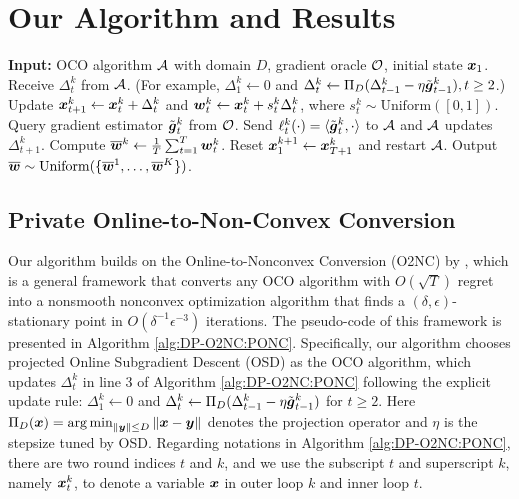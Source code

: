 \section{Our Algorithm and Results}
\label{sec:DP-O2NC_result}

\begin{algorithm}[t]
\caption{Online-to-Nonconvex Conversion}
\label{alg:DP-O2NC:PONC}
\begin{algorithmic}[1]
    \Statex \textbf{Input:} OCO algorithm ${\cal A}$ with domain $D$, gradient oracle ${\cal O}$, initial state ${\boldsymbol{x}}_1$.
        \State Receive $\Delta_t^k$ from ${\cal A}$. (For example, $\Delta_1^k\gets 0$ and $\Delta_t^k\gets\Pi_D(\Delta_{t-1}^k-\eta\tilde{{\boldsymbol{g}}}_{t-1}^k), t\ge 2$.)
        \State Update ${\boldsymbol{x}}_{t+1}^k \gets {\boldsymbol{x}}_t^k + \Delta_t^k$ and ${\boldsymbol{w}}_t^k \gets {\boldsymbol{x}}_t^k + s_t^k\Delta_t^k$, where $s_t^k\sim \mathrm{Uniform}([0,1])$.
        \State Query gradient estimator $\tilde{{\boldsymbol{g}}}_t^k$ from ${\cal O}$.
        \State Send $\ell_t^k(\cdot) = \langle \tilde{{\boldsymbol{g}}}_t^k, \cdot\rangle$ to ${\cal A}$ and ${\cal A}$ updates $\Delta_{t+1}^k$.
    \EndFor
    \State Compute $\overline {{\boldsymbol{w}}}^k \gets \frac{1}{T}\sum_{t=1}^T {\boldsymbol{w}}_t^k$.
    \State Reset ${\boldsymbol{x}}_1^{k+1}\gets {\boldsymbol{x}}_{T+1}^k$ and restart ${\cal A}$.
    \EndFor
    \State Output $\overline{{\boldsymbol{w}}} \sim \mathrm{Uniform}(\{\overline{{\boldsymbol{w}}}^1,\ldots, \overline{{\boldsymbol{w}}}^K\})$.
\end{algorithmic}
\end{algorithm}


\subsection{Private Online-to-Non-Convex Conversion}
\label{sec:DP-O2NC_algorithm}

Our algorithm builds on the Online-to-Nonconvex Conversion (O2NC) by \citep{cutkosky2023optimal}, which is a general framework that converts any OCO algorithm with $O(\sqrt{T})$ regret into a nonsmooth nonconvex optimization algorithm that finds a $(\delta,\epsilon)$-stationary point in $O(\delta^{-1}\epsilon^{-3})$ iterations. The pseudo-code of this framework is presented in Algorithm \ref{alg:DP-O2NC:PONC}. 
Specifically, our algorithm chooses projected Online Subgradient Descent (OSD) as the OCO algorithm, which updates $\Delta_t^k$ in line 3 of Algorithm \ref{alg:DP-O2NC:PONC} following the explicit update rule: $\Delta_1^k \gets 0$ and $\Delta_t^k \gets \Pi_D(\Delta_{t-1}^k-\eta \tilde{{\boldsymbol{g}}}_{t-1}^k)$ for $t\ge 2$. Here $\Pi_D({\boldsymbol{x}}) = \mathop{\operatorname{arg\,min}}_{\|{\boldsymbol{y}}\|\le D} \|{\boldsymbol{x}}-{\boldsymbol{y}}\|$ denotes the projection operator and $\eta$ is the stepsize tuned by OSD.
Regarding notations in Algorithm \ref{alg:DP-O2NC:PONC}, there are two round indices $t$ and $k$, and we use the subscript $t$ and superscript $k$, namely ${\boldsymbol{x}}_t^k$, to denote a variable ${\boldsymbol{x}}$ in outer loop $k$ and inner loop $t$.

